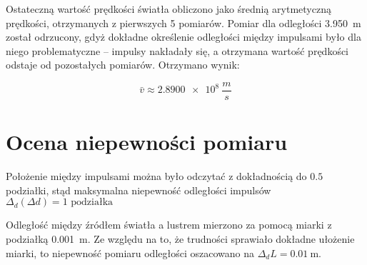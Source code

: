 \documentclass[a4paper,12pt]{article}
\begin{document}
Ostateczną wartość prędkości światła obliczono jako średnią arytmetyczną prędkości, otrzymanych z pierwszych 5 pomiarów. Pomiar dla odległości \SI{3.950}{\meter} został odrzucony, gdyż dokładne określenie odległości między impulsami było dla niego problematyczne -- impulsy nakładały się, a otrzymana wartość prędkości odstaje od pozostałych pomiarów. Otrzymano wynik:

\begin{equation*}
    \bar{v} \approx \SI{2.8900e8}{\frac{m}{s}}
\end{equation*}


\section{Ocena niepewności pomiaru}

Położenie między impulsami można było odczytać z dokładnością do $\num{0,5}$ podziałki, stąd maksymalna niepewność odległości impulsów $\Delta_d(\Delta d) = 1 \text{ podziałka}$

Odległość między źródłem światła a lustrem mierzono za pomocą miarki z podziałką \SI{0.001}{\meter}. Ze względu na to, że trudności sprawiało dokładne ułożenie miarki, to niepewność pomiaru odległości oszacowano na $\Delta_d L = \SI{0.01}{\meter}$.









\end{document}
